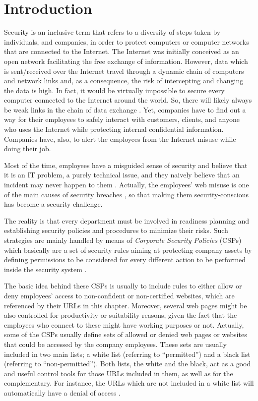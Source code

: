 \documentclass{llncs}
\begin{document}
\section{Introduction}
\label{sec:introduction}

\noindent Security is an inclusive term that refers to a diversity of steps taken by individuals, 
and companies, in order to protect computers or computer networks that are connected to the Internet. 
The Internet was initially conceived as an open network facilitating the free exchange of information. 
However, data which is sent/received over the Internet travel through a dynamic chain of computers and 
network links and, as a consequence, the risk of intercepting and changing the data is high. 
In fact, it would be virtually impossible to secure every computer connected to the Internet around the world. 
So, there will likely always be weak links in the chain of data exchange \cite{cheswick2003firewalls}. 
Yet, companies have to find out a way for their employees to safely interact with customers, clients, and anyone 
who uses the Internet while protecting internal confidential information. Companies have, also, to alert the employees 
from the Internet misuse while doing their job.
 
Most of the time, employees have a misguided sense of security and believe that it is an IT problem, a purely technical 
issue, and they naively believe that an incident may never happen to them \cite{stanton2005analysis}.  
Actually, the employees' web misuse is one of the main causes of  security breaches \cite{breivik2002abstract},  
so that making them security-conscious has become a security  challenge. 

The reality is that every department must be involved in  readiness planning and establishing security policies 
and procedures  to minimize their risks. Such strategies are mainly handled by 
means  of \textit{Corporate Security Policies} (CSPs) which basically are a  set of security rules aiming at 
protecting company assets by defining  permissions to be considered for every different action to be  performed 
inside the security system \cite{kaeo2003designing}.
 
The basic idea behind these CSPs is usually to include rules to either allow or deny employees' access to 
non-confident or non-certified websites, which are referenced by their URLs in this chapter. Moreover, several web pages 
might be also controlled for productivity  or suitability reasons, given the fact that the employees who connect  
to these might have working purposes or not. Actually, some of the  CSPs usually define sets of allowed or denied 
web pages or websites that could be accessed by the company employees. These sets are  usually included in two main 
lists; a white list (referring to  ``permitted'') and a black list (referring to  ``non-permitted''). 
Both lists, the white and the black, act as a  good and useful control tools for those URLs included in them, 
as  well as for the complementary. For instance, the URLs which are not included in a white list will automatically 
have a denial of  access \cite{ludl2007effectiveness}.
\end{document}
